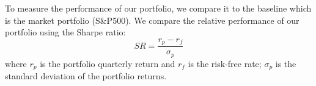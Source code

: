 \documentclass{llncs}\usepackage[]{graphicx}\usepackage[]{color}
\begin{document}
To measure the  performance of our portfolio, we compare it to  the baseline which is the market portfolio (S\&P500). We compare the relative performance of our portfolio using the Sharpe ratio:
\begin{equation}
SR=\frac{r_p-r_f}{\sigma_p}
\end{equation}
where $r_p$ is the  portfolio quarterly  return and $r_f$ is the risk-free rate; $\sigma_p$ is the standard deviation of the portfolio returns.

%
%
%
%
%
%
%
\end{document}
